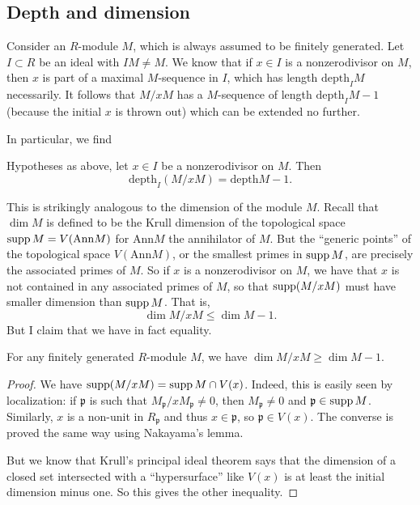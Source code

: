 \subsection{Depth and dimension}

Consider an $R$-module $M$, which is always assumed to be finitely generated.
Let $I \subset R$ be an ideal with $IM \neq M$. We know
that if $x \in I$ is a nonzerodivisor on $M$, then $x$ is part of a maximal
$M$-sequence in $I$, which has length $\mathrm{depth}_I M$ necessarily.
It follows that $M/xM$ has a $M$-sequence of length $\mathrm{depth}_I M - 1$ (because
the initial $x$ is thrown out) which can be extended no further.

In particular, we find
\begin{proposition} 
Hypotheses as above, let $x \in I$ be a nonzerodivisor on $M$. Then 
\[ \mathrm{depth}_I (M/xM) = \mathrm{depth} M - 1.  \]
\end{proposition} 

This is strikingly analogous to the dimension of the module $M$. 
Recall that $\dim M$ is defined to be the Krull dimension of the topological
space  $\operatorname{supp} M = V( \mathrm{Ann} M)$ for $\mathrm{Ann} M$ the annihilator of $M$.
But the ``generic points'' of the topological space $V(\mathrm{Ann} M)$, or the
smallest primes in $\operatorname{supp} M$, are precisely the associated primes of $M$. 
So if $x$ is a nonzerodivisor on $M$, we have that $x$ is not contained
in any associated primes of $M$, so that $\operatorname{supp}(M/xM)$ must have smaller
dimension than $\operatorname{supp} M$. That is,
\[ \dim M/xM \leq \dim M - 1.  \]
But I claim that we have in fact equality. 

\begin{lemma} 
For any finitely generated $R$-module $M$, we have $\dim M /xM \geq \dim M - 1$.
\end{lemma} 
\begin{proof} We have $\operatorname{supp}(M/xM) = \operatorname{supp} M \cap V(x)$. Indeed, this is easily
seen by localization: if $\mathfrak{p}$ is such that $M_{\mathfrak{p}}/x
M_{\mathfrak{p}} \neq 0$, then $M_{\mathfrak{p}} \neq 0$ and $\mathfrak{p} \in
\operatorname{supp} M$. Similarly, $x$ is a non-unit in $R_\mathfrak{p}$ and thus $x \in
\mathfrak{p}$, so $\mathfrak{p} \in V(x)$. The converse is proved the same way
using Nakayama's lemma.

But we know that Krull's principal ideal theorem says that the dimension of a
closed set intersected with a ``hypersurface'' like $V(x)$ is at least the
initial dimension minus one. So this gives the other inequality. 
\end{proof} 

